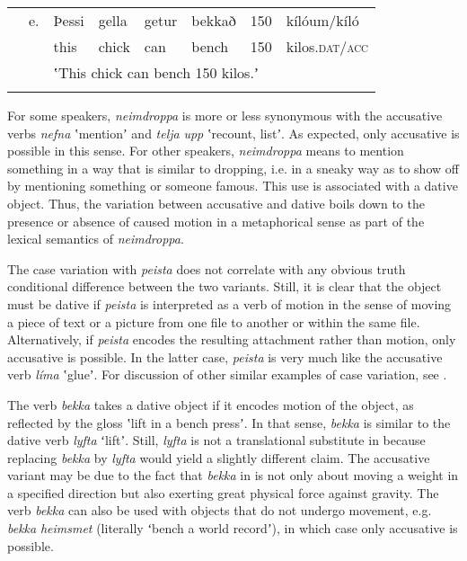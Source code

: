 \tabletail{}
\tablelasttail{}
\begin{tabularx}{\textwidth}{XXXXXXXX} & e. & Þessi & gella & getur & bekkað & 150 & kílóum/kíló\\
\lsptoprule
&  & this & chick & can & bench & 150 & kilos.\textsc{dat/acc}\\
&  & \multicolumn{6}{X}{ʽThis chick can bench 150 kilos.ʼ}\\
\lspbottomrule
\end{tabularx}
For some speakers, \textit{neimdroppa} is more or less synonymous with the accusative verbs \textit{nefna} ʽmentionʼ and \textit{telja} \textit{upp} ʽrecount, listʼ. As expected, only accusative is possible in this sense. For other speakers,  \textit{neimdroppa} means to mention something in a way that is similar to dropping, i.e. in a sneaky way as to show off by mentioning something or someone famous. This use is associated with a dative object. Thus, the variation between accusative and dative boils down to the presence or absence of caused motion in a metaphorical sense as part of the lexical semantics of \textit{neimdroppa}.

The case variation with \textit{peista} does not correlate with any obvious truth conditional difference between the two variants. Still, it is clear that the object must be dative if \textit{peista} is interpreted as a verb of motion in the sense of moving a piece of text or a picture from one file to another or within the same file. Alternatively, if \textit{peista} encodes the resulting attachment rather than motion, only accusative is possible. In the latter case, \textit{peista} is very much like the accusative verb \textit{líma} ʽglueʼ. For discussion of other similar examples of case variation, see \citet{Jónsson2013a}.

The verb \textit{bekka} takes a dative object if it encodes motion of the object, as reflected by the gloss ʽlift in a bench pressʼ. In that sense, \textit{bekka} is similar to the dative verb \textit{lyfta} ʻliftʼ. Still, \textit{lyfta} is not a translational substitute in  because replacing \textit{bekka} by \textit{lyfta} would yield a slightly different claim. The accusative variant may be due to the fact that \textit{bekka} in  is not only about moving a weight in a specified direction but also exerting great physical force against gravity. The verb \textit{bekka} can also be used with objects that do not undergo movement, e.g. \textit{bekka} \textit{heimsmet} (literally ʻbench a world recordʼ), in which case only accusative is possible. 

